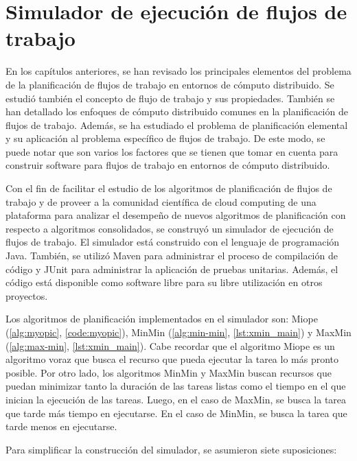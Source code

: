 \chapter[Simulador]{Simulador de ejecución de flujos de trabajo}

En los capítulos anteriores, se han revisado los principales elementos del problema de la planificación de flujos de trabajo en entornos de cómputo distribuido. Se estudió también el concepto de flujo de trabajo y sus propiedades. También se han detallado los enfoques de cómputo distribuido comunes en la planificación de flujos de trabajo. Además, se ha estudiado el problema de planificación elemental y su aplicación al problema específico de flujos de trabajo. De este modo, se puede notar que son varios los factores que se tienen que tomar en cuenta para construir software para flujos de trabajo en entornos de cómputo distribuido.

Con el fin de facilitar el estudio de los algoritmos de planificación de flujos de trabajo y de proveer a la comunidad científica de cloud computing de una plataforma para analizar el desempeño de nuevos algoritmos de planificación con respecto a algoritmos consolidados, se construyó un simulador de ejecución de flujos de trabajo. El simulador está construido con el lenguaje de programación Java. También, se utilizó Maven \cite{maven2014} para administrar el proceso de compilación de código y JUnit \cite{junit2014} para administrar la aplicación de pruebas unitarias. Además, el código está disponible como software libre \cite{dominofire2014workflowsimulator} para su libre utilización en otros proyectos.

Los algoritmos de planificación implementados en el simulador son: Miope (\ref{alg:myopic}, \ref{code:myopic}), MinMin (\ref{alg:min-min}, \ref{lst:xmin_main}) y MaxMin (\ref{alg:max-min}, \ref{lst:xmin_main}). Cabe recordar que el algoritmo Miope es un algoritmo voraz que busca el recurso que pueda ejecutar la tarea lo más pronto posible. Por otro lado, los algoritmos MinMin y MaxMin buscan recursos que puedan minimizar tanto la duración de las tareas listas como el tiempo en el que inician la ejecución de las tareas. Luego, en el caso de MaxMin, se busca la tarea que tarde más tiempo en ejecutarse. En el caso de MinMin, se busca la tarea que tarde menos en ejecutarse.

Para simplificar la construcción del simulador, se asumieron siete suposiciones:


